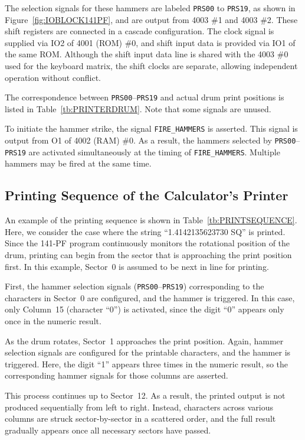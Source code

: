 The selection signals for these hammers are labeled \texttt{PRS00} to \texttt{PRS19}, as shown in Figure~\ref{fig:IOBLOCK141PF}, and are output from 4003 \#1 and 4003 \#2. These shift registers are connected in a cascade configuration. The clock signal is supplied via IO2 of 4001 (ROM) \#0, and shift input data is provided via IO1 of the same ROM. Although the shift input data line is shared with the 4003 \#0 used for the keyboard matrix, the shift clocks are separate, allowing independent operation without conflict.

The correspondence between \texttt{PRS00}–\texttt{PRS19} and actual drum print positions is listed in Table~\ref{tb:PRINTERDRUM}. Note that some signals are unused.

To initiate the hammer strike, the signal \texttt{FIRE\_HAMMERS} is asserted. This signal is output from O1 of 4002 (RAM) \#0. As a result, the hammers selected by \texttt{PRS00}–\texttt{PRS19} are activated simultaneously at the timing of \texttt{FIRE\_HAMMERS}. Multiple hammers may be fired at the same time.

\subsection{Printing Sequence of the Calculator's Printer}
An example of the printing sequence is shown in Table~\ref{tb:PRINTSEQUENCE}. Here, we consider the case where the string “1.4142135623730 SQ” is printed. Since the 141-PF program continuously monitors the rotational position of the drum, printing can begin from the sector that is approaching the print position first. In this example, Sector~0 is assumed to be next in line for printing.

First, the hammer selection signals (\texttt{PRS00}–\texttt{PRS19}) corresponding to the characters in Sector~0 are configured, and the hammer is triggered. In this case, only Column~15 (character “0”) is activated, since the digit “0” appears only once in the numeric result.

As the drum rotates, Sector~1 approaches the print position. Again, hammer selection signals are configured for the printable characters, and the hammer is triggered. Here, the digit “1” appears three times in the numeric result, so the corresponding hammer signals for those columns are asserted.

This process continues up to Sector~12. As a result, the printed output is not produced sequentially from left to right. Instead, characters across various columns are struck sector-by-sector in a scattered order, and the full result gradually appears once all necessary sectors have passed.

